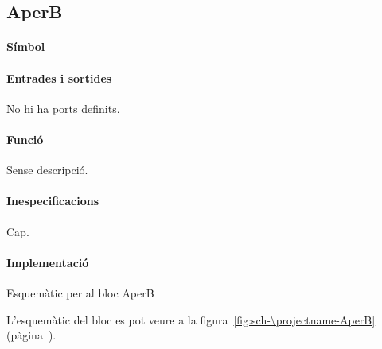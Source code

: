 \subsection{\label{sub:\projectname-AperB} \textsf{AperB}}

\paragraph{Símbol}

\begin{center}  \end{center}

\paragraph{Entrades i sortides}

No hi ha ports definits.

\paragraph{Funció}

Sense descripció.

\paragraph{Inespecificacions}

Cap.

\paragraph{Implementació}


\begin{contendfig}
  \begin{center}
  \end{center}
  \caption{\label{fig:sch-\projectname-AperB} Esquemàtic per al bloc \textsf{AperB}}
\end{contendfig}

L'esquemàtic del bloc es pot veure a la figura~\ref{fig:sch-\projectname-AperB} (pàgina~\pageref{fig:sch-\projectname-AperB}).


\vspace{1cm}
